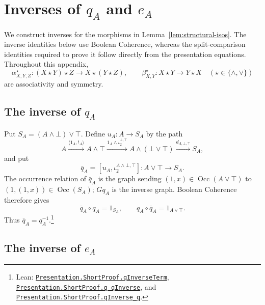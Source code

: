 \documentclass[11pt]{article}
\newcommand{\Occ}{\operatorname{Occ}}
\begin{document}
\section{Inverses of \texorpdfstring{$q_A$ and $e_A$}{qA and eA}}
\label{app:explicit-inverses}

We construct inverses for the morphisms in
Lemma~\ref{lem:structural-isos}. The inverse identities below
use Boolean Coherence, whereas the split-comparison identities
required to prove it follow directly from the presentation equations.
Throughout this appendix,
\[
 \alpha^\star_{X,Y,Z}:(X\star Y)\star Z\longrightarrow
          X\star(Y\star Z),\qquad
 \beta^\star_{X,Y}:X\star Y\longrightarrow Y\star X
 \quad(\star\in\{\wedge,\vee\})
\]
are associativity and symmetry.

\subsection{The inverse of \texorpdfstring{$q_A$}{qA}}

Put $S_A=(A\wedge\bot)\vee\top$. Define $u_A:A\to S_A$ by
the path
\[
 A\xrightarrow{\langle1_A,!_A\rangle}A\wedge\top
  \xrightarrow{1_A\wedge\iota_2^{\bot,\top}}A\wedge(\bot\vee\top)
  \xrightarrow{d_{A,\bot,\top}}S_A,
\]
and put
\[
 \bar q_A=[u_A,\iota_2^{A\wedge\bot,\top}]:
      A\vee\top\longrightarrow S_A.
\]
The occurrence relation of $\bar q_A$ is the graph sending
$(1,x)\in\Occ(A\vee\top)$ to
$(1,(1,x))\in\Occ(S_A)$; $Gq_A$ is the inverse graph.
Boolean Coherence therefore gives
\[
 \bar q_A\circ q_A=1_{S_A},\qquad
 q_A\circ\bar q_A=1_{A\vee\top}.
\]
Thus $\bar q_A=q_A^{-1}$.\footnote{\raggedright Lean:
\href{https://github.com/flengyel/Dosen-Petric-Maximality/blob/dosen-petric-v25-palomar-v3/DosenPetric/PresentationShortQ.lean\#L17}{\texttt{Presentation.ShortProof.\allowbreak{}qInverseTerm}},
\href{https://github.com/flengyel/Dosen-Petric-Maximality/blob/dosen-petric-v25-palomar-v3/DosenPetric/PresentationShortQ.lean\#L32}{\texttt{Presentation.ShortProof.\allowbreak{}q\_qInverse}}, and
\href{https://github.com/flengyel/Dosen-Petric-Maximality/blob/dosen-petric-v25-palomar-v3/DosenPetric/PresentationShortQ.lean\#L46}{\texttt{Presentation.ShortProof.\allowbreak{}qInverse\_q}}.}

\subsection{The inverse of \texorpdfstring{$e_A$}{eA}}
\end{document}
